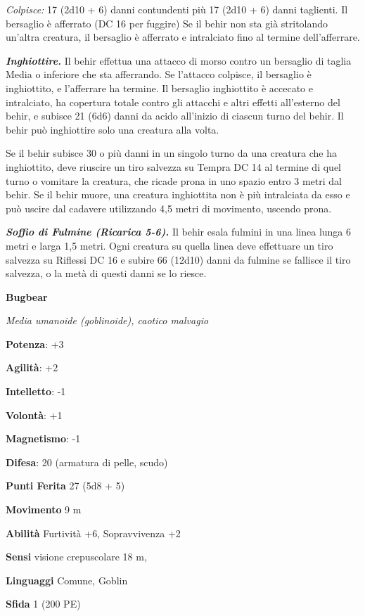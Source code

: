\begin{multicols}{2}
\emph{Colpisce:} 17 (2d10 + 6) danni contundenti più 17 (2d10 + 6) danni
taglienti. Il bersaglio è afferrato (DC 16 per fuggire) Se il behir non
sta già stritolando un'altra creatura, il bersaglio è afferrato e
intralciato fino al termine dell'afferrare.

\emph{\textbf{Inghiottire.}} Il behir effettua una attacco di morso
contro un bersaglio di taglia Media o inferiore che sta afferrando. Se
l'attacco colpisce, il bersaglio è inghiottito, e l'afferrare ha
termine. Il bersaglio inghiottito è accecato e intralciato, ha copertura
totale contro gli attacchi e altri effetti all'esterno del behir, e
subisce 21 (6d6) danni da acido all'inizio di ciascun turno del behir.
Il behir può inghiottire solo una creatura alla volta.

Se il behir subisce 30 o più danni in un singolo turno da una creatura
che ha inghiottito, deve riuscire un tiro salvezza su Tempra DC 14
al termine di quel turno o vomitare la creatura, che ricade prona in uno
spazio entro 3 metri dal behir. Se il behir muore, una creatura
inghiottita non è più intralciata da esso e può uscire dal cadavere
utilizzando 4,5 metri di movimento, uscendo prona.

\emph{\textbf{Soffio di Fulmine (Ricarica 5-6).}} Il behir esala fulmini
in una linea lunga 6 metri e larga 1,5 metri. Ogni creatura su quella
linea deve effettuare un tiro salvezza su Riflessi DC 16 e subire 66
(12d10) danni da fulmine se fallisce il tiro salvezza, o la metà di
questi danni se lo riesce.

\textbf{Bugbear}

\emph{Media umanoide (goblinoide), caotico malvagio}

\textbf{Potenza}: +3

\textbf{Agilità}: +2

\textbf{Intelletto}: -1

\textbf{Volontà}: +1

\textbf{Magnetismo}: -1

\textbf{Difesa}: 20 (armatura di pelle, scudo)

\textbf{Punti Ferita} 27 (5d8 + 5)

\textbf{Movimento} 9 m

\textbf{Abilità} Furtività +6, Sopravvivenza +2

\textbf{Sensi} visione crepuscolare 18 m, 

\textbf{Linguaggi} Comune, Goblin

\textbf{Sfida} 1 (200 PE)


\end{multicols}
